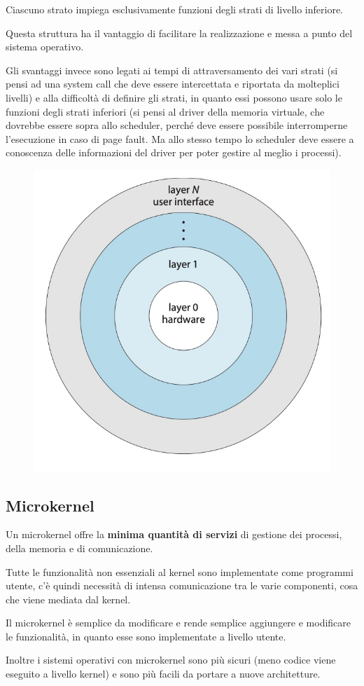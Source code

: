 Ciascuno strato impiega esclusivamente funzioni degli strati di livello inferiore.

\spacer
Questa struttura ha il vantaggio di facilitare la realizzazione e messa a punto del sistema operativo.

Gli svantaggi invece sono legati ai tempi di attraversamento dei vari strati (si pensi ad una system call che deve essere intercettata e riportata da molteplici livelli) e alla difficoltà di definire gli strati, in quanto essi possono usare solo le funzioni degli strati inferiori (si pensi al driver della memoria virtuale, che dovrebbe essere sopra allo scheduler, perché deve essere possibile interromperne l'esecuzione in caso di page fault. Ma allo stesso tempo lo scheduler deve essere a conoscenza delle informazioni del driver per poter gestire al meglio i processi).

\begin{figure}[H]
    \centering
    \includegraphics[width=0.4\linewidth]{assets/os-layered.jpg}
\end{figure}

\subsection{Microkernel}
Un microkernel offre la \textbf{minima quantità di servizi} di gestione dei processi, della memoria e di comunicazione.

Tutte le funzionalità non essenziali al kernel sono implementate come programmi utente, c'è quindi necessità di intensa comunicazione tra le varie componenti, cosa che viene mediata dal kernel.

\spacer
Il microkernel è semplice da modificare e rende semplice aggiungere e modificare le funzionalità, in quanto esse sono implementate a livello utente.

Inoltre i sistemi operativi con microkernel sono più sicuri (meno codice viene eseguito a livello kernel) e sono più facili da portare a nuove architetture.

